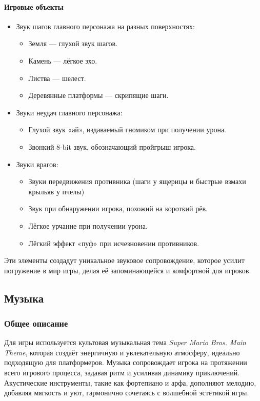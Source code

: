 \documentclass{article}
\begin{document}
\paragraph{Игровые объекты}  
\begin{itemize}
    \item Звук шагов главного персонажа на разных поверхностях:  
    \begin{itemize}
        \item Земля — глухой звук шагов.  
        \item Камень — лёгкое эхо.  
        \item Листва — шелест.  
        \item Деревянные платформы — скрипящие шаги.  
    \end{itemize}
    \item Звуки неудач главного персонажа:  
    \begin{itemize}
        \item Глухой звук «ай», издаваемый гномиком при получении урона.  
        \item Звонкий 8-bit звук, обозначающий пройгрыш игрока.  
    \end{itemize}
    \item Звуки врагов:  
    \begin{itemize}
        \item Звуки передвижения противника (шаги у ящерицы и быстрые взмахи крыльяв у пчелы)
        \item Звук при обнаружении игрока, похожий на короткий рёв.
        \item Лёгкое урчание при получении урона.  
        \item Лёгкий эффект «пуф» при исчезновении противников.  
    \end{itemize}
\end{itemize}

Эти элементы создадут уникальное звуковое сопровождение, которое усилит погружение в мир игры, делая её запоминающейся и комфортной для игроков.

\subsection{Музыка}

\subsubsection{Общее описание}
Для игры используется культовая музыкальная тема \textit{Super Mario Bros. Main Theme}, которая создаёт энергичную и увлекательную атмосферу, идеально подходящую для платформеров. Музыка сопровождает игрока на протяжении всего игрового процесса, задавая ритм и усиливая динамику приключений. Акустические инструменты, такие как фортепиано и арфа, дополняют мелодию, добавляя мягкость и уют, гармонично сочетаясь с волшебной эстетикой игры.
\end{document}
